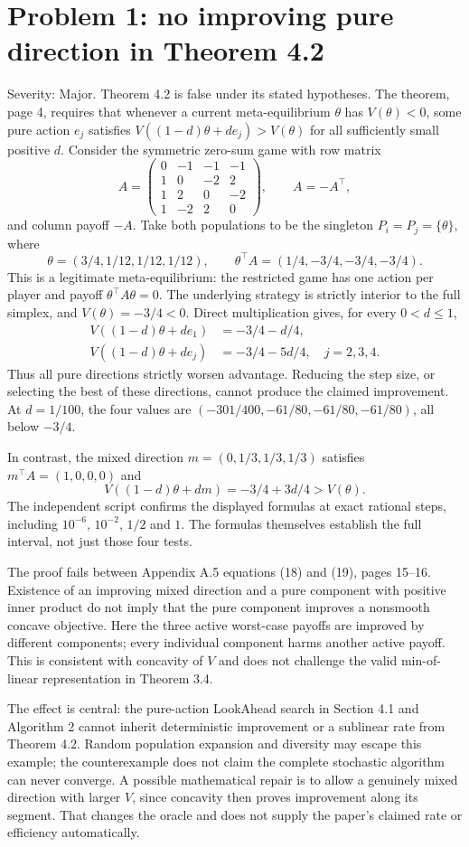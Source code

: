 \documentclass[10pt]{article}
\begin{document}
\section*{Problem 1: no improving pure direction in Theorem 4.2}
Severity: Major. Theorem 4.2 is false under its stated hypotheses. The theorem, page 4, requires that whenever a current meta-equilibrium \(\theta\) has \(V(\theta)<0\), some pure action \(e_j\) satisfies \(V((1-d)\theta+de_j)>V(\theta)\) for all sufficiently small positive \(d\). Consider the symmetric zero-sum game with row matrix \[A=\begin{pmatrix}
0&-1&-1&-1\\
1&0&-2&2\\
1&2&0&-2\\
1&-2&2&0
\end{pmatrix},\qquad A=-A^\top,\] and column payoff \(-A\). Take both populations to be the singleton \(P_i=P_j=\{\theta\}\), where \[\theta=(3/4,1/12,1/12,1/12),\qquad
 \theta^\top A=(1/4,-3/4,-3/4,-3/4).\] This is a legitimate meta-equilibrium: the restricted game has one action per player and payoff \(\theta^\top A\theta=0\). The underlying strategy is strictly interior to the full simplex, and \(V(\theta)=-3/4<0\). Direct multiplication gives, for every \(0<d\le1\), \[\begin{aligned}
 V((1-d)\theta+de_1)&=-3/4-d/4,\\
 V((1-d)\theta+de_j)&=-3/4-5d/4,\quad j=2,3,4.\end{aligned}\] Thus all pure directions strictly worsen advantage. Reducing the step size, or selecting the best of these directions, cannot produce the claimed improvement. At \(d=1/100\), the four values are \((-301/400,-61/80,-61/80,-61/80)\), all below \(-3/4\).\par
In contrast, the mixed direction \(m=(0,1/3,1/3,1/3)\) satisfies \(m^\top A=(1,0,0,0)\) and \[V((1-d)\theta+dm)=-3/4+3d/4>V(\theta).\] The independent script confirms the displayed formulas at exact rational steps, including \(10^{-6}\), \(10^{-2}\), \(1/2\) and \(1\). The formulas themselves establish the full interval, not just those four tests.\par
The proof fails between Appendix A.5 equations (18) and (19), pages 15–16. Existence of an improving mixed direction and a pure component with positive inner product do not imply that the pure component improves a nonsmooth concave objective. Here the three active worst-case payoffs are improved by different components; every individual component harms another active payoff. This is consistent with concavity of \(V\) and does not challenge the valid min-of-linear representation in Theorem 3.4.\par
The effect is central: the pure-action LookAhead search in Section 4.1 and Algorithm 2 cannot inherit deterministic improvement or a sublinear rate from Theorem 4.2. Random population expansion and diversity may escape this example; the counterexample does not claim the complete stochastic algorithm can never converge. A possible mathematical repair is to allow a genuinely mixed direction with larger \(V\), since concavity then proves improvement along its segment. That changes the oracle and does not supply the paper’s claimed rate or efficiency automatically.\par
\end{document}
